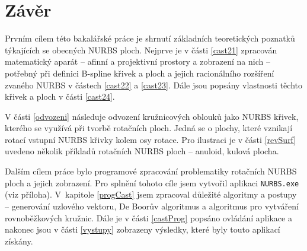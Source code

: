 \chapter*{Závěr}

Prvním cílem této bakalářské práce je shrnutí základních teoretických poznatků týkajících se obecných NURBS ploch. Nejprve je v části \ref{cast21} zpracován matematický aparát -- afinní a projektivní prostory a zobrazení na nich -- potřebný při definici B-spline křivek a ploch a jejich racionálního rozšíření zvaného NURBS v částech \ref{cast22} a \ref{cast23}. Dále jsou popsány vlastnosti těchto křivek a ploch v části \ref{cast24}.

V části \ref{odvozeni} následuje odvození kružnicových oblouků jako NURBS křivek, kterého se využívá při tvorbě rotačních ploch. Jedná se o plochy, které vznikají rotací vstupní NURBS křivky kolem osy rotace. Pro ilustraci je v části \ref{revSurf} uvedeno několik příkladů rotačních NURBS ploch -- anuloid, kulová plocha.

Dalším cílem práce bylo programové zpracování problematiky rotačních NURBS ploch a jejich zobrazení. Pro splnění tohoto cíle jsem vytvořil aplikaci \texttt{NURBS.exe} (viz příloha). V~kapitole \ref{progCast} jsem zpracoval důležité algoritmy a postupy -- generování uzlového vektoru, De Boorův algoritmus a algoritmus pro vytváření rovnoběžkových kružnic. Dále je v části \ref{castProg} popsáno ovládání aplikace a nakonec jsou v části \ref{vystupy} zobrazeny výsledky, které byly touto aplikací získány.